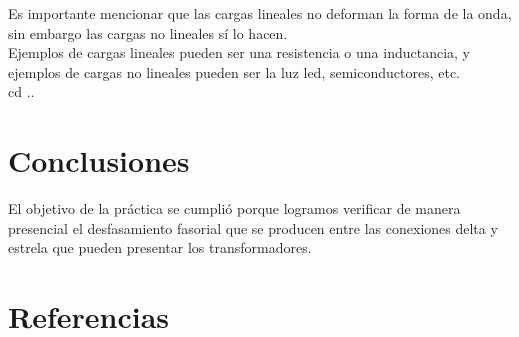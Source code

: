 \documentclass[]{article}
\begin{document}
	
	Es importante mencionar que las cargas lineales no deforman la forma de la onda, sin embargo las cargas no lineales sí lo hacen.\\
	
	Ejemplos de cargas lineales pueden ser una resistencia o una inductancia, y ejemplos de cargas no lineales pueden ser la luz led, semiconductores, etc.\\
    
	cd ..
	\section{Conclusiones}
	
	El objetivo de la práctica se cumplió porque logramos verificar de manera presencial el desfasamiento fasorial que se producen entre las conexiones delta y estrela que pueden presentar los transformadores.

	\section{Referencias}
	

	
    
    


	
	
\end{document}

